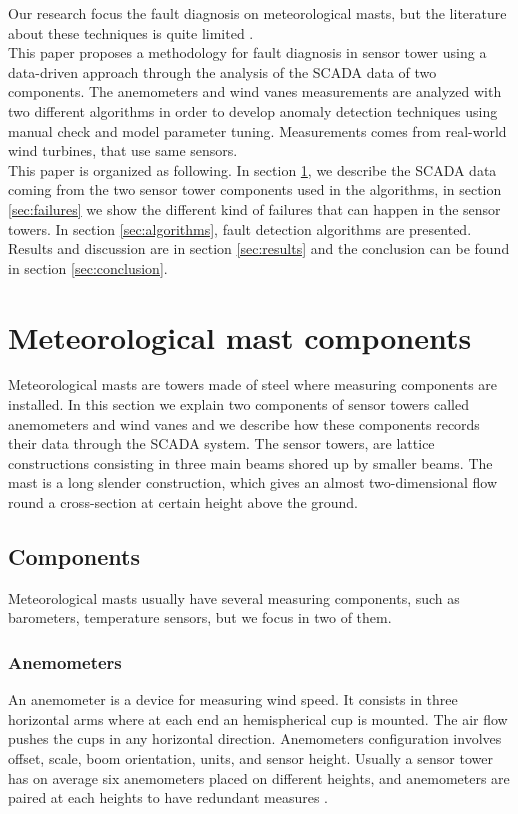 \documentclass[conference]{IEEEtran}
\begin{document}
Our research focus the fault diagnosis on meteorological masts,   
but the literature about these techniques is quite limited \cite{hasu2006weather} .\\
This paper proposes a methodology for fault diagnosis in sensor tower using a data-driven approach through the analysis of the SCADA data of two components. The anemometers and wind vanes measurements are analyzed with two different algorithms in order to develop anomaly detection techniques using manual check and model parameter tuning. Measurements comes from real-world wind turbines, that use same sensors.  \\
This paper is organized as following. In section \ref{sec:sensortower}, we describe the SCADA data coming from the two sensor tower components used in the algorithms, in section \ref{sec:failures} we show the different kind of failures that can happen in the sensor towers. In section \ref{sec:algorithms}, fault detection algorithms are presented. Results and discussion are in section \ref{sec:results} and the conclusion can be found in section \ref{sec:conclusion}.

\section{Meteorological mast components}\label{sec:sensortower}
Meteorological masts are towers made of steel where measuring components are installed. In this section we explain two components of sensor towers called anemometers and wind vanes and we describe how these components records their data through the SCADA system.
The sensor towers, are  lattice constructions consisting in three main beams shored up by smaller beams. The mast is a long slender construction, which gives an almost two-dimensional flow round a cross-section at certain height above the ground. 

\subsection{Components}
Meteorological masts usually have several measuring components, such as barometers, temperature sensors, but we focus in two of them.
\subsubsection{Anemometers}
An anemometer is a device for measuring wind speed. It consists in three horizontal arms where at each end an hemispherical cup is mounted. The air flow pushes the cups in any horizontal direction. Anemometers configuration involves offset, scale, boom orientation, units, and sensor height. Usually a sensor tower has on average six anemometers placed on different heights, and  anemometers are paired at each heights to have redundant measures \cite{clifton2014135}.
\end{document}
